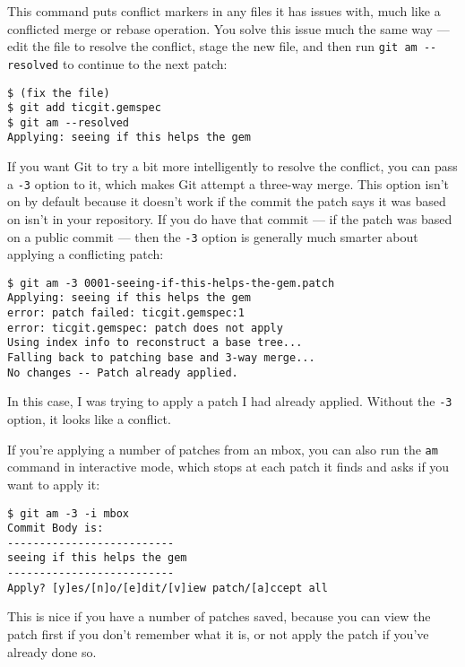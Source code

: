 \documentclass[a4paper]{book}
\begin{document}
This command puts conflict markers in any files it has issues with, much like a conflicted merge or rebase operation. You solve this issue much the same way --- edit the file to resolve the conflict, stage the new file, and then run \texttt{git am -{}-resolved} to continue to the next patch:

\begin{shaded}\begin{verbatim}
$ (fix the file)
$ git add ticgit.gemspec
$ git am --resolved
Applying: seeing if this helps the gem
\end{verbatim}\end{shaded}

If you want Git to try a bit more intelligently to resolve the conflict, you can pass a \texttt{-3} option to it, which makes Git attempt a three-way merge. This option isn't on by default because it doesn't work if the commit the patch says it was based on isn't in your repository. If you do have that commit --- if the patch was based on a public commit --- then the \texttt{-3} option is generally much smarter about applying a conflicting patch:

\begin{shaded}\begin{verbatim}
$ git am -3 0001-seeing-if-this-helps-the-gem.patch
Applying: seeing if this helps the gem
error: patch failed: ticgit.gemspec:1
error: ticgit.gemspec: patch does not apply
Using index info to reconstruct a base tree...
Falling back to patching base and 3-way merge...
No changes -- Patch already applied.
\end{verbatim}\end{shaded}

In this case, I was trying to apply a patch I had already applied. Without the \texttt{-3} option, it looks like a conflict.

If you're applying a number of patches from an mbox, you can also run the \texttt{am} command in interactive mode, which stops at each patch it finds and asks if you want to apply it:

\begin{shaded}\begin{verbatim}
$ git am -3 -i mbox
Commit Body is:
--------------------------
seeing if this helps the gem
--------------------------
Apply? [y]es/[n]o/[e]dit/[v]iew patch/[a]ccept all
\end{verbatim}\end{shaded}

This is nice if you have a number of patches saved, because you can view the patch first if you don't remember what it is, or not apply the patch if you've already done so.
\end{document}
